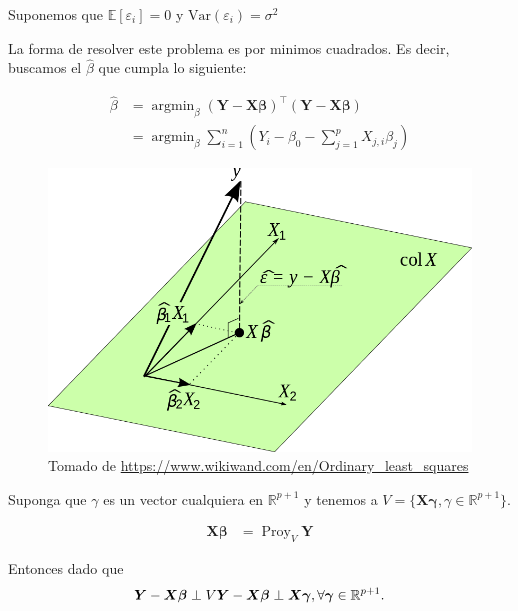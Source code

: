 \documentclass[
  12pt,
]{book}
\theoremstyle{definition}
\theoremstyle{definition}
\theoremstyle{definition}
\theoremstyle{remark}
\begin{document}
Suponemos que \(\mathbb{E}\left[\varepsilon_{i}\right] = 0\) y \(\mathrm{Var}\left(\varepsilon_{i}\right) = \sigma^{2}\)

La forma de resolver este problema es por minimos cuadrados. Es decir, buscamos el \(\hat{\beta}\) que cumpla lo siguiente:

\begin{align}
\hat{\beta} &= 
 \operatorname{argmin}_\beta (\boldsymbol{Y} - \boldsymbol{X} \boldsymbol{\beta})^{\top} (\boldsymbol{Y} - \boldsymbol{X} \boldsymbol{\beta})\\
 &=  \operatorname{argmin}_\beta \sum_{i=1}^n \left( Y_{i} -\beta_{0} - \sum_{j=1}^p X_{j,i} \beta_{j} \right) 
 \label{eq:minimos-cuadrados}
 \end{align}

\begin{figure}
\centering
\includegraphics{manual_figures/ols.png}
\caption{Tomado de \url{https://www.wikiwand.com/en/Ordinary_least_squares}}
\end{figure}

Suponga que \(\gamma\) es un vector cualquiera en \(\mathbb{R}^{p+1}\) y tenemos a \(V = \{\boldsymbol{X}\boldsymbol{\gamma}, \gamma \in \mathbb{R}^{p+1}\}\).

\begin{align*}
\boldsymbol{X}\boldsymbol{\beta}
 &= \operatorname{Proy}_{V} \boldsymbol{Y}
\end{align*}

Entonces dado que
\begin{equation*}
\boldsymbol{Y}-\boldsymbol{X}\boldsymbol{\beta} \perp V \\
\boldsymbol{Y}-\boldsymbol{X}\boldsymbol{\beta} \perp \boldsymbol{X}\boldsymbol{\gamma}, \forall \boldsymbol{\gamma} \in \mathbb{R}^{p+1}.
\end{equation*}
\end{document}
